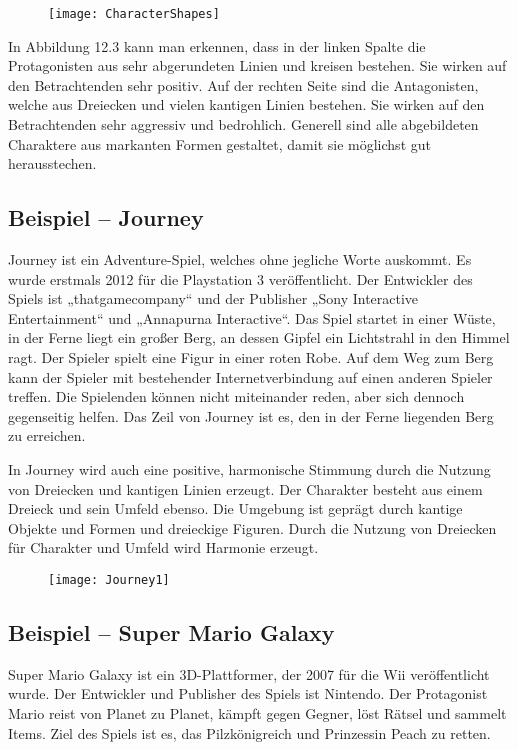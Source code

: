 \begin{figure}[H]
	\centering
	\texttt{[image: CharacterShapes]}
	\caption{\cite{solarski2012drawing}}
\end{figure}

In Abbildung 12.3 kann man erkennen, dass in der linken Spalte die Protagonisten aus sehr abgerundeten Linien und kreisen bestehen. Sie wirken auf den Betrachtenden sehr positiv. Auf der rechten Seite sind die Antagonisten, welche aus Dreiecken und vielen kantigen Linien bestehen. Sie wirken auf den Betrachtenden sehr aggressiv und bedrohlich. Generell sind alle abgebildeten Charaktere aus markanten Formen gestaltet, damit sie möglichst gut herausstechen. 
\cite{solarski2012drawing}

\subsection{Beispiel – Journey}
Journey ist ein Adventure-Spiel, welches ohne jegliche Worte auskommt. Es wurde erstmals 2012 für die Playstation 3 veröffentlicht. Der Entwickler des Spiels ist „thatgamecompany“ und der Publisher „Sony Interactive Entertainment“ und „Annapurna Interactive“. Das Spiel startet in einer Wüste, in der Ferne liegt ein großer Berg, an dessen Gipfel ein Lichtstrahl in den Himmel ragt. Der Spieler spielt eine Figur in einer roten Robe. Auf dem Weg zum Berg kann der Spieler mit bestehender Internetverbindung auf einen anderen Spieler treffen. Die Spielenden können nicht miteinander reden, aber sich dennoch gegenseitig helfen. Das Zeil von Journey ist es, den in der Ferne liegenden Berg zu erreichen.
\cite{solarski2012drawing}

In Journey wird auch eine positive, harmonische Stimmung durch die Nutzung von Dreiecken und kantigen Linien erzeugt. Der Charakter besteht aus einem Dreieck und sein Umfeld ebenso. Die Umgebung ist geprägt durch kantige Objekte und Formen und dreieckige Figuren. Durch die Nutzung von Dreiecken für Charakter und Umfeld wird Harmonie erzeugt. 
\cite{solarski2012drawing}

\begin{figure}[H]
	\centering
	\texttt{[image: Journey1]}
	\caption{\cite{solarski2012drawing}}
\end{figure}

\subsection{Beispiel – Super Mario Galaxy}
Super Mario Galaxy ist ein 3D-Plattformer, der 2007 für die Wii veröffentlicht wurde. Der Entwickler und Publisher des Spiels ist Nintendo. Der Protagonist Mario reist von Planet zu Planet, kämpft gegen Gegner, löst Rätsel und sammelt Items. Ziel des Spiels ist es, das Pilzkönigreich und Prinzessin Peach zu retten. 

